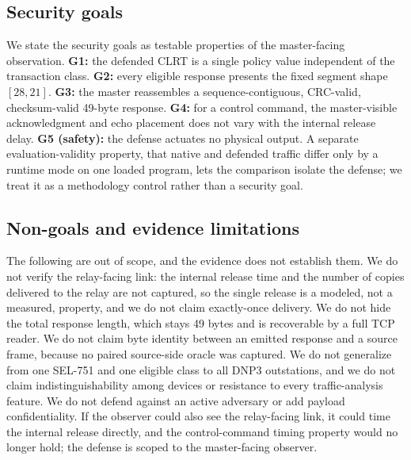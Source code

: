 \subsection{Security goals}
We state the security goals as testable properties of the master-facing observation. \textbf{G1:} the
defended CLRT is a single policy value independent of the transaction class. \textbf{G2:} every
eligible response presents the fixed segment shape $[28,21]$. \textbf{G3:} the master reassembles a
sequence-contiguous, CRC-valid, checksum-valid 49-byte response. \textbf{G4:} for a control command,
the master-visible acknowledgment and echo placement does not vary with the internal release delay.
\textbf{G5 (safety):} the defense actuates no physical output. A separate evaluation-validity
property, that native and defended traffic differ only by a runtime mode on one loaded program, lets
the comparison isolate the defense; we treat it as a methodology control rather than a security goal.

\subsection{Non-goals and evidence limitations}
The following are out of scope, and the evidence does not establish them. We do not verify the
relay-facing link: the internal release time and the number of copies delivered to the relay are not
captured, so the single release is a modeled, not a measured, property, and we do not claim
exactly-once delivery. We do not hide the total response length, which stays 49 bytes and is
recoverable by a full TCP reader. We do not claim byte identity between an emitted response and a
source frame, because no paired source-side oracle was captured. We do not generalize from one
SEL-751 and one eligible class to all DNP3 outstations, and we do not claim indistinguishability among
devices or resistance to every traffic-analysis feature. We do not defend against an active adversary
or add payload confidentiality. If the observer could also see the relay-facing link, it could time
the internal release directly, and the control-command timing property would no longer hold; the
defense is scoped to the master-facing observer.

